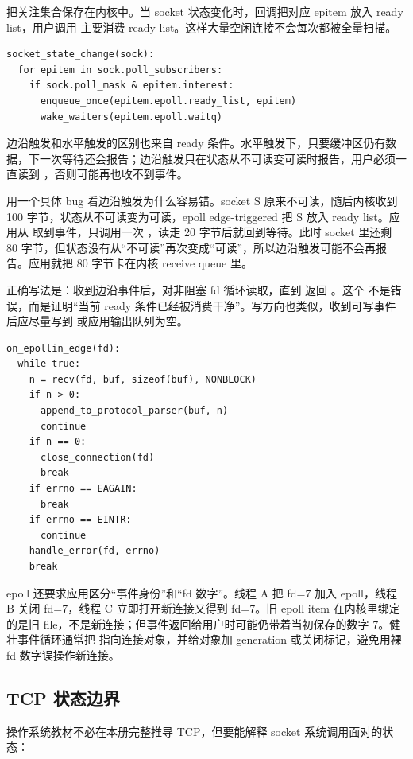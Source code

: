 把关注集合保存在内核中。当 socket 状态变化时，回调把对应 epitem 放入 ready list，用户调用  主要消费 ready list。这样大量空闲连接不会每次都被全量扫描。

\begin{lstlisting}
socket_state_change(sock):
  for epitem in sock.poll_subscribers:
    if sock.poll_mask & epitem.interest:
      enqueue_once(epitem.epoll.ready_list, epitem)
      wake_waiters(epitem.epoll.waitq)
\end{lstlisting}

边沿触发和水平触发的区别也来自 ready 条件。水平触发下，只要缓冲区仍有数据，下一次等待还会报告；边沿触发只在状态从不可读变可读时报告，用户必须一直读到 ，否则可能再也收不到事件。

用一个具体 bug 看边沿触发为什么容易错。socket S 原来不可读，随后内核收到 100 字节，状态从不可读变为可读，epoll edge-triggered 把 S 放入 ready list。应用从  取到事件，只调用一次 ，读走 20 字节后就回到等待。此时 socket 里还剩 80 字节，但状态没有从“不可读”再次变成“可读”，所以边沿触发可能不会再报告。应用就把 80 字节卡在内核 receive queue 里。

正确写法是：收到边沿事件后，对非阻塞 fd 循环读取，直到  返回 。这个  不是错误，而是证明“当前 ready 条件已经被消费干净”。写方向也类似，收到可写事件后应尽量写到  或应用输出队列为空。

\begin{lstlisting}
on_epollin_edge(fd):
  while true:
    n = recv(fd, buf, sizeof(buf), NONBLOCK)
    if n > 0:
      append_to_protocol_parser(buf, n)
      continue
    if n == 0:
      close_connection(fd)
      break
    if errno == EAGAIN:
      break
    if errno == EINTR:
      continue
    handle_error(fd, errno)
    break
\end{lstlisting}

epoll 还要求应用区分“事件身份”和“fd 数字”。线程 A 把 fd=7 加入 epoll，线程 B 关闭 fd=7，线程 C 立即打开新连接又得到 fd=7。旧 epoll item 在内核里绑定的是旧 file，不是新连接；但事件返回给用户时可能仍带着当初保存的数字 7。健壮事件循环通常把  指向连接对象，并给对象加 generation 或关闭标记，避免用裸 fd 数字误操作新连接。

\subsection{TCP 状态边界}

操作系统教材不必在本册完整推导 TCP，但要能解释 socket 系统调用面对的状态：


